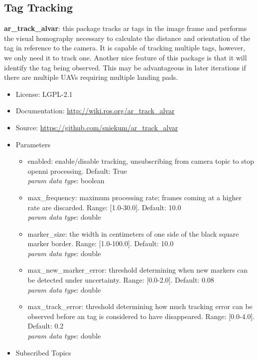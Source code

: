 \subsection{Tag Tracking}
\noindent \textbf{ar\_track\_alvar}: this package tracks ar tags in the image frame and performs the visual homography necessary to calculate the distance and orientation of the tag in reference to the camera. It is capable of tracking multiple tags, however, we only need it to track one. Another nice feature of this package is that it will identify the tag being observed. This may be advantageous in later iterations if there are multiple UAVs requiring multiple landing pads.\\

\begin{itemize}
\item License: LGPL-2.1
\item Documentation: \url{http://wiki.ros.org/ar_track_alvar}
\item Source: \url{https://github.com/sniekum/ar_track_alvar}
\item Parameters
\begin{itemize}
\item enabled: enable/disable tracking, unsubscribing from camera topic to stop openni processing. Default: True\\
\textit{param data type}: boolean
\item max\_frequency: maximum processing rate; frames coming at a higher rate are discarded. Range: [1.0-30.0]. Default: 10.0\\
\textit{param data type}: double
\item marker\_size: the width in centimeters of one side of the black square marker border. Range: [1.0-100.0]. Default: 10.0\\
\textit{param data type}: double
\item max\_new\_marker\_error: threshold determining when new markers can be detected under uncertainty. Range: [0.0-2.0]. Default: 0.08\\
\textit{param data type}: double
\item max\_track\_error: threshold determining how much tracking error can be observed before an tag is considered to have disappeared. Range: [0.0-4.0]. Default: 0.2\\
\textit{param data type}: double
\end{itemize}
\item Subscribed Topics
\begin{itemize}

\end{itemize}
\end{itemize}
